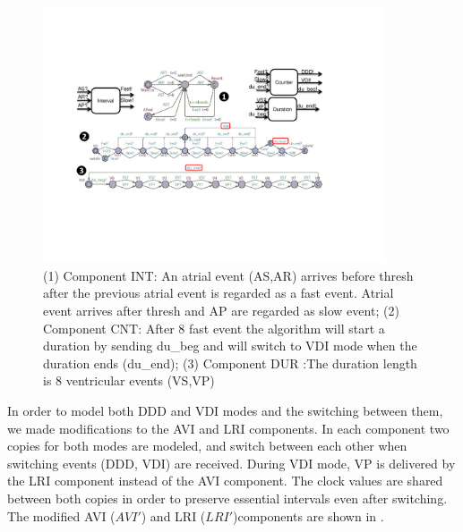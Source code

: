 \begin{figure}
		\centering
		\includegraphics[width=0.9\textwidth]{figs/duration.pdf}
		\caption{\small (1) Component \textsf{INT}: An atrial event (\textsf{AS,AR}) arrives before \textsf{thresh} after the previous atrial event is regarded as a \textsf{fast} event. Atrial event arrives after \textsf{thresh} and \textsf{AP} are regarded as \textsf{slow} event; (2) Component \textsf{CNT}: After 8 \textsf{fast} event the algorithm will start a duration by sending \textsf{du\_beg} and will switch to \textsf{VDI} mode when the duration ends (\textsf{du\_end}); (3) Component \textsf{DUR} :The duration length is 8 ventricular events (\textsf{VS,VP})}
		\label{fig:dur_count}
\end{figure} 

In order to model both DDD and VDI modes and the switching between them, we made modifications to the AVI and LRI components.
In each component two copies for both modes are modeled, and switch between each other when switching events (DDD, VDI) are received. During VDI mode, \textsf{VP} is delivered by the LRI component instead of the AVI component. The clock values are shared between both copies in order to preserve essential intervals even after switching. The modified AVI ($AVI'$) and LRI ($LRI'$)components are shown in . 

